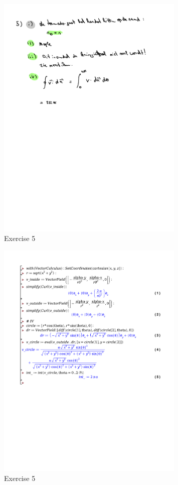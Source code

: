 \documentclass[a4paper]{report}
\begin{document}
\begin{figure}[H]
	\centering
	\includegraphics[width=0.8\textwidth]{assets/huis_6_ex_5.pdf}
	\caption{Exercise 5}
	\label{fig:huis_6_ex_5}
\end{figure}

\begin{figure}[H]
	\centering
	\includegraphics[width=0.8\textwidth]{exercises/huis_6_ex_5.pdf}
	\caption{Exercise 5}
	\label{fig:huis_6_ex_5_maple}
\end{figure}
\end{document}
